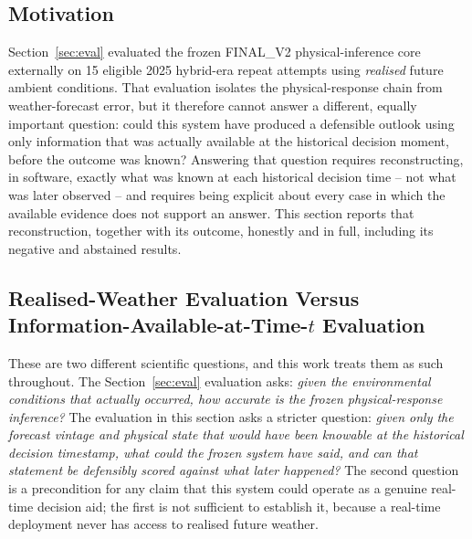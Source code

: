 \subsection{Motivation}
Section~\ref{sec:eval} evaluated the frozen FINAL\_V2 physical-inference core externally on 15 eligible 2025
hybrid-era repeat attempts using \emph{realised} future ambient conditions. That evaluation isolates the
physical-response chain from weather-forecast error, but it therefore cannot answer a different, equally
important question: could this system have produced a defensible outlook using only information that was
actually available at the historical decision moment, before the outcome was known? Answering that question
requires reconstructing, in software, exactly what was known at each historical decision time -- not what was
later observed -- and requires being explicit about every case in which the available evidence does not
support an answer. This section reports that reconstruction, together with its outcome, honestly and in
full, including its negative and abstained results.

\subsection{Realised-Weather Evaluation Versus Information-Available-at-Time-$t$ Evaluation}
These are two different scientific questions, and this work treats them as such throughout. The Section~\ref{sec:eval}
evaluation asks: \emph{given the environmental conditions that actually occurred, how accurate is the frozen
physical-response inference?} The evaluation in this section asks a stricter question: \emph{given only the
forecast vintage and physical state that would have been knowable at the historical decision timestamp, what
could the frozen system have said, and can that statement be defensibly scored against what later happened?}
The second question is a precondition for any claim that this system could operate as a genuine real-time
decision aid; the first is not sufficient to establish it, because a real-time deployment never has access to
realised future weather.

